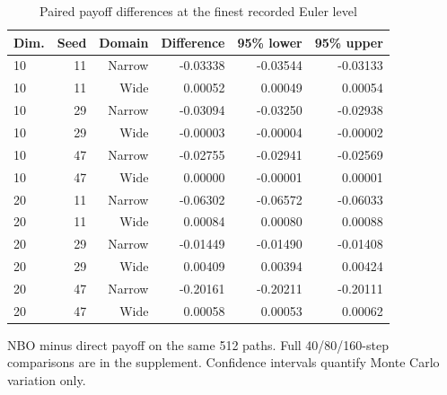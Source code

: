 \begin{table}[htbp]\centering
\caption{Paired payoff differences at the finest recorded Euler level}
\begin{small}\begin{tabular}{lrrrrr}
\toprule
Dim. & Seed & Domain & Difference & 95\% lower & 95\% upper \\
\midrule
10 & 11 & Narrow & -0.03338 & -0.03544 & -0.03133 \\
10 & 11 & Wide & 0.00052 & 0.00049 & 0.00054 \\
10 & 29 & Narrow & -0.03094 & -0.03250 & -0.02938 \\
10 & 29 & Wide & -0.00003 & -0.00004 & -0.00002 \\
10 & 47 & Narrow & -0.02755 & -0.02941 & -0.02569 \\
10 & 47 & Wide & 0.00000 & -0.00001 & 0.00001 \\
20 & 11 & Narrow & -0.06302 & -0.06572 & -0.06033 \\
20 & 11 & Wide & 0.00084 & 0.00080 & 0.00088 \\
20 & 29 & Narrow & -0.01449 & -0.01490 & -0.01408 \\
20 & 29 & Wide & 0.00409 & 0.00394 & 0.00424 \\
20 & 47 & Narrow & -0.20161 & -0.20211 & -0.20111 \\
20 & 47 & Wide & 0.00058 & 0.00053 & 0.00062 \\
\bottomrule\end{tabular}\end{small}
\par\smallskip\begin{minipage}{.96\linewidth}\footnotesize NBO minus direct payoff on the same 512 paths. Full 40/80/160-step comparisons are in the supplement. Confidence intervals quantify Monte Carlo variation only.\end{minipage}
\end{table}

